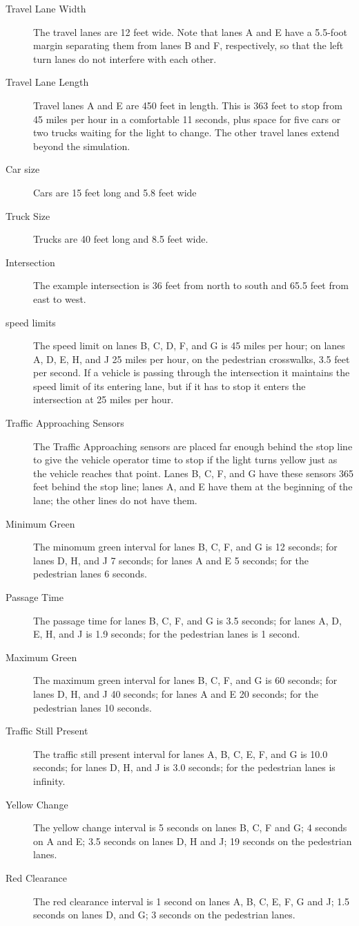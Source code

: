 \documentclass[letterpaper,twoside]{article}
\begin{document}
\begin{description}
\item[Travel Lane Width]{The travel lanes are 12 feet wide.  Note that lanes
  A and E have a 5.5-foot margin separating them from lanes B and F,
  respectively, so that the left turn lanes do not interfere with each other.}
\item[Travel Lane Length]{Travel lanes A and E are 450 feet in length.
  This is 363 feet to stop from 45 miles per hour in a comfortable 11 seconds,
  plus space for five cars or two trucks waiting for the light to change.
  The other travel lanes extend beyond the simulation.}
\item[Car size]{Cars are 15 feet long and 5.8 feet wide}
\item[Truck Size]{Trucks are 40 feet long and 8.5 feet wide.}
\item[Intersection]{The example intersection is 36 feet from north to south
  and 65.5 feet from east to west.}
\item[speed limits]{The speed limit on lanes B, C, D, F, and G is
  45 miles per hour; on lanes A, D, E, H, and J 25 miles per hour,
  on the pedestrian crosswalks, 3.5 feet per second.
  If a vehicle is passing through the intersection it maintains the
  speed limit of its entering lane, but if it has to stop it enters
  the intersection at 25 miles per hour.}
\item[Traffic Approaching Sensors]{The Traffic Approaching sensors are placed
  far enough behind the stop line to give the vehicle operator time to stop
  if the light turns yellow just as the vehicle reaches that point.
  Lanes B, C, F, and G have these sensors 365 feet behind the stop line;
  lanes A, and E have them at the beginning of the lane; the other lines
  do not have them.}
\item[Minimum Green]{The minomum green interval for lanes B, C, F, and G
  is 12 seconds; for lanes D, H, and J 7 seconds; for lanes A and E 5 seconds;
  for the pedestrian lanes 6 seconds.}
\item[Passage Time]{The passage time for lanes B, C, F, and G is 3.5
  seconds; for lanes A, D, E, H, and J is 1.9 seconds;
  for the pedestrian lanes is 1 second.}
\item[Maximum Green]{The maximum green interval for lanes B, C, F, and G
  is 60 seconds; for lanes D, H, and J 40 seconds; for lanes A and E
  20 seconds; for the pedestrian lanes 10 seconds.}
\item[Traffic Still Present]{The traffic still present interval for
  lanes A, B, C, E, F, and G is 10.0 seconds; for lanes D, H, and J is
  3.0 seconds; for the pedestrian lanes is infinity.}
\item[Yellow Change]{The yellow change interval is 5 seconds on lanes
  B, C, F and G; 4 seconds on A and E; 3.5 seconds on lanes D, H and J;
  19 seconds on the pedestrian lanes.}
\item[Red Clearance]{The red clearance interval is 1 second on lanes A, B, C,
  E, F, G and J; 1.5 seconds on lanes D, and G; 3 seconds on
  the pedestrian lanes.}
\end{description}
\end{document}
